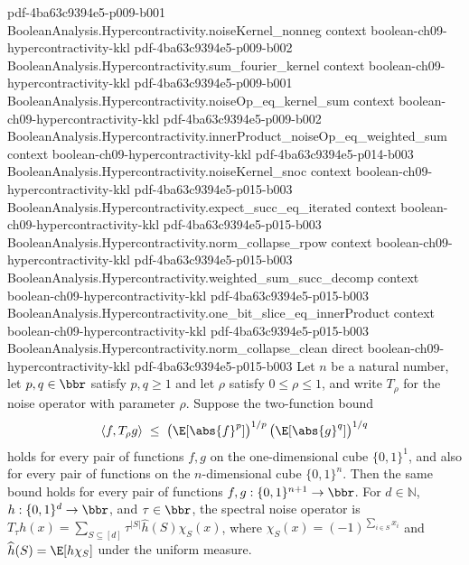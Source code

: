 \begin{lemma}
  {pdf-4ba63c9394e5-p009-b001}
\proofstep
  {BooleanAnalysis.Hypercontractivity.noiseKernel_nonneg}
  {context}
  {boolean-ch09-hypercontractivity-kkl}
  {pdf-4ba63c9394e5-p009-b002}
\proofstep
  {BooleanAnalysis.Hypercontractivity.sum_fourier_kernel}
  {context}
  {boolean-ch09-hypercontractivity-kkl}
  {pdf-4ba63c9394e5-p009-b001}
\proofstep
  {BooleanAnalysis.Hypercontractivity.noiseOp_eq_kernel_sum}
  {context}
  {boolean-ch09-hypercontractivity-kkl}
  {pdf-4ba63c9394e5-p009-b002}
\proofstep
  {BooleanAnalysis.Hypercontractivity.innerProduct_noiseOp_eq_weighted_sum}
  {context}
  {boolean-ch09-hypercontractivity-kkl}
  {pdf-4ba63c9394e5-p014-b003}
\proofstep
  {BooleanAnalysis.Hypercontractivity.noiseKernel_snoc}
  {context}
  {boolean-ch09-hypercontractivity-kkl}
  {pdf-4ba63c9394e5-p015-b003}
\proofstep
  {BooleanAnalysis.Hypercontractivity.expect_succ_eq_iterated}
  {context}
  {boolean-ch09-hypercontractivity-kkl}
  {pdf-4ba63c9394e5-p015-b003}
\proofstep
  {BooleanAnalysis.Hypercontractivity.norm_collapse_rpow}
  {context}
  {boolean-ch09-hypercontractivity-kkl}
  {pdf-4ba63c9394e5-p015-b003}
\proofstep
  {BooleanAnalysis.Hypercontractivity.weighted_sum_succ_decomp}
  {context}
  {boolean-ch09-hypercontractivity-kkl}
  {pdf-4ba63c9394e5-p015-b003}
\proofstep
  {BooleanAnalysis.Hypercontractivity.one_bit_slice_eq_innerProduct}
  {context}
  {boolean-ch09-hypercontractivity-kkl}
  {pdf-4ba63c9394e5-p015-b003}
\proofstep
  {BooleanAnalysis.Hypercontractivity.norm_collapse_clean}
  {direct}
  {boolean-ch09-hypercontractivity-kkl}
  {pdf-4ba63c9394e5-p015-b003}
Let $n$ be a natural number, let $p,q\in\bbr$ satisfy $p,q\ge1$ and let $\rho$ satisfy
$0 \le \rho \le 1$, and write $T_\rho$ for the
noise operator with parameter $\rho$. Suppose the two-function bound
\[
\langle f, T_\rho g\rangle \;\le\;
\bigl(\E[\abs{f}^p]\bigr)^{1/p}\,\bigl(\E[\abs{g}^q]\bigr)^{1/q}
\]
holds for every pair of functions $f, g$ on the one-dimensional cube $\{0,1\}^1$, and
also for every pair of functions on the $n$-dimensional cube $\{0,1\}^n$. Then the same
bound holds for every pair of functions $f, g : \{0,1\}^{n+1} \to \bbr$. For
$d\in\mathbb N$, $h:\{0,1\}^d\to\bbr$, and $\tau\in\bbr$, the spectral noise operator is
$T_\tau h(x)=\sum_{S\subseteq[d]}\tau^{|S|}\widehat h(S)\chi_S(x)$, where
$\chi_S(x)=(-1)^{\sum_{i\in S}x_i}$ and $\widehat h(S)=\E[h\chi_S]$ under the uniform
measure.
\end{lemma}

